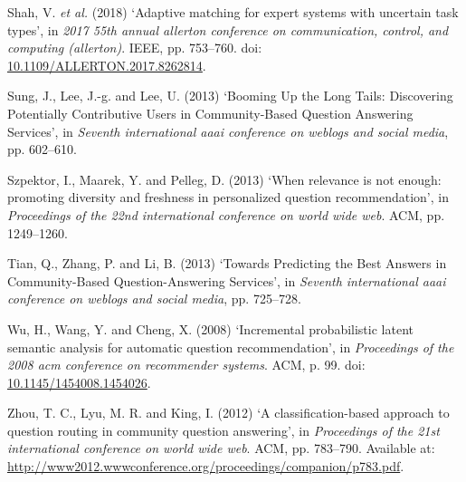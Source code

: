 \documentclass[11pt,preprint, authoryear]{article}
\numberwithin{equation}{section}
\begin{document}
\hypertarget{ref-Shah2018}{}
Shah, V. \emph{et al.} (2018) `Adaptive matching for expert systems with
uncertain task types', in \emph{2017 55th annual allerton conference on
communication, control, and computing (allerton)}. IEEE, pp. 753--760.
doi:
\href{https://doi.org/10.1109/ALLERTON.2017.8262814}{10.1109/ALLERTON.2017.8262814}.

\hypertarget{ref-Sung2013}{}
Sung, J., Lee, J.-g. and Lee, U. (2013) `Booming Up the Long Tails:
Discovering Potentially Contributive Users in Community-Based Question
Answering Services', in \emph{Seventh international aaai conference on
weblogs and social media}, pp. 602--610.

\hypertarget{ref-Szpektor2013}{}
Szpektor, I., Maarek, Y. and Pelleg, D. (2013) `When relevance is not
enough: promoting diversity and freshness in personalized question
recommendation', in \emph{Proceedings of the 22nd international
conference on world wide web}. ACM, pp. 1249--1260.

\hypertarget{ref-Tian2013}{}
Tian, Q., Zhang, P. and Li, B. (2013) `Towards Predicting the Best
Answers in Community-Based Question-Answering Services', in
\emph{Seventh international aaai conference on weblogs and social
media}, pp. 725--728.

\hypertarget{ref-Wu2008}{}
Wu, H., Wang, Y. and Cheng, X. (2008) `Incremental probabilistic latent
semantic analysis for automatic question recommendation', in
\emph{Proceedings of the 2008 acm conference on recommender systems}.
ACM, p. 99. doi:
\href{https://doi.org/10.1145/1454008.1454026}{10.1145/1454008.1454026}.

\hypertarget{ref-Zhou2012}{}
Zhou, T. C., Lyu, M. R. and King, I. (2012) `A classification-based
approach to question routing in community question answering', in
\emph{Proceedings of the 21st international conference on world wide
web}. ACM, pp. 783--790. Available at:
\url{http://www2012.wwwconference.org/proceedings/companion/p783.pdf}.

\newcommand\wordcount{
    \immediate\write18{texcount -sub=section \jobname.tex  | grep "Section" |     sed -e 's/+.*//' | sed -n \thesection p > 'count.txt'}
(words)}
\end{document}
